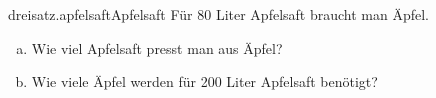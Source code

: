 \begin{exercise}{dreisatz.apfelsaft}{Apfelsaft}
  \ifproblem\problem
    Für 80 Liter Apfelsaft braucht man  Äpfel.
    \begin{enumerate}[a)]
      \item Wie viel Apfelsaft presst man aus  Äpfel?
      \item Wie viele Äpfel werden für 200 Liter Apfelsaft benötigt?
    \end{enumerate}
  \fi
\end{exercise}
